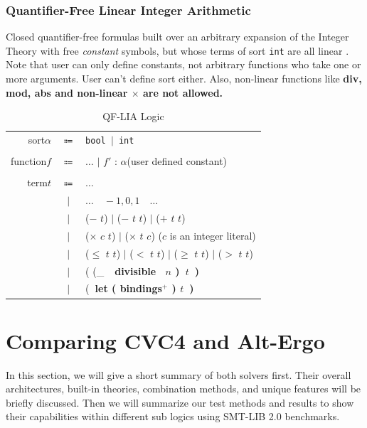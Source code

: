 \documentclass[10pt,twocolumn,letter]{article}
\theoremstyle{definition}
\begin{document}
\subsubsection{Quantifier-Free Linear Integer Arithmetic}
Closed quantifier-free formulas built over an arbitrary expansion of the
Integer Theory with free {\it constant} symbols, but whose terms of sort {\tt int}
are all linear \cite{bs2010}. Note that user can only define constants, not arbitrary functions who take one or more arguments. User can't define sort either. Also, non-linear functions like \bf div\rm, \bf mod\rm, \bf abs \rm and non-linear $\times$ are not allowed.

\begin{table}[!h]
\begin{mdframed}
\centering
\begin{tabular}{r c l}
sort\qquad $\alpha$ & $\Coloneqq$ & \tt bool $\mid$ int\\
\\
function\qquad $f$ & $\Coloneqq$ & $\ldots$ $\mid$ \rm $f'$ : $\alpha$\qquad(user defined constant)\\
\\
term\qquad $t$ & $\Coloneqq$ & $\ldots$ \\
& $\mid$ & $\ldots\quad-1,0,1\quad\ldots$\\
& $\mid$ & ($-$ $t$) $\mid$ ($-$ $t$ $t$) $\mid$ ($+$ $t$ $t$) \\
& $\mid$ & ($\times$ $c$ $t$) $\mid$ ($\times$ $t$ $c$) \qquad($c$ is an integer literal)\\
& $\mid$ & ($\leqslant$ $t$ $t$) $\mid$ ($<$ $t$ $t$) $\mid$ ($\geqslant$ $t$ $t$) $\mid$ ($>$ $t$ $t$)\\
& $\mid$ & ( (_\ \bf\ divisible \rm\ $n$ )\ $t$\ )\\
& $\mid$ & (\bf\ let \rm ( bindings$^+$ ) $t$\ )\\

\end{tabular}
\end{mdframed}
\caption{QF-LIA Logic}
\end{table}

\section{Comparing CVC4 and Alt-Ergo}

In this section, we will give a short summary of both solvers first. Their overall architectures, built-in theories, combination methods, and unique features will be briefly discussed. Then we will summarize our test methods and results to show their capabilities within different sub logics using SMT-LIB 2.0 benchmarks.
\end{document}
